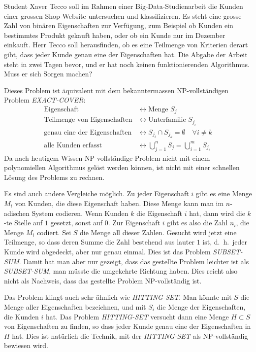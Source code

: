 Student Xaver Tecco soll im Rahmen einer Big-Data-Studienarbeit die 
Kunden einer grossen Shop-Website untersuchen und klassifizieren.
Es steht eine grosse Zahl von binären Eigenschaften zur Verfügung,
zum Beispiel ob Kunden ein bestimmtes Produkt gekauft haben, oder
ob ein Kunde nur im Dezember einkauft.
Herr Tecco soll herausfinden, ob es eine Teilmenge von Kriterien derart
gibt, dass jeder Kunde genau eine der Eigenschaften hat.
Die Abgabe der Arbeit steht in zwei Tagen bevor, und er hat noch keinen
funktionierenden Algorithmus.
Muss er sich Sorgen machen?

\begin{loesung}
Dieses Problem ist äquivalent mit dem bekanntermassen NP-vollständigen
Problem \textsl{EXACT-COVER}:
\begin{align*}
\text{Eigenschaft}&\leftrightarrow \text{Menge $S_j$}\\
\text{Teilmenge von Eigenschaften}&\leftrightarrow \text{Unterfamilie $S_{j_i}$}\\
\text{genau eine der Eigenschaften}&\leftrightarrow S_{j_i}\cap S_{j_k}=\emptyset\quad\forall i\ne k\\
\text{alle Kunden erfasst}&\leftrightarrow \bigcup_{j=1}^nS_j=\bigcup_{i=1}^m S_{j_i}
\end{align*}
Da nach heutigem Wissen NP-vollständige Problem nicht mit einem polynomiellen
Algorithmus gelöst werden können, ist nicht mit einer schnellen Lösung
des Problems zu rechnen.

Es sind auch andere Vergleiche möglich.
Zu jeder Eigenschaft $i$ gibt es eine Menge $M_i$ von Kunden, die diese
Eigenschaft haben.
Diese Menge kann man im $n$-adischen System codieren.
Wenn Kunden $k$ die Eigenschaft $i$ hat, dann wird die $k$-te Stelle
auf $1$ gesetzt, sonst auf $0$.
Zur Eigenschaft $i$ gibt es also die Zahl $n_i$, die Menge $M_i$
codiert.
Sei $S$ die Menge all dieser Zahlen.
Gesucht wird jetzt eine Teilmenge, so dass deren Summe die Zahl
bestehend aus lauter $1$ ist, d.~h.~jeder Kunde wird abgedeckt, aber
nur genau einmal.
Dies ist das Problem \textsl{SUBSET-SUM}.
Damit hat man aber nur gezeigt, dass das gestellte Problem leichter ist
als \textsl{SUBSET-SUM}, man müsste die umgekehrte Richtung haben.
Dies reicht also nicht als Nachweis, dass das gestellte Problem
NP-vollständig ist.

Das Problem klingt auch sehr ähnlich wie \textsl{HITTING-SET}.
Man könnte mit $S$ die Menge aller Eigenschaften bezeichnen,
und mit $S_i$ die Menge der Eigenschaften, die Kunden $i$ hat.
Das Problem \textsl{HITTING-SET} versucht dann eine Menge $H\subset S$
von Eigenschaften zu finden, so dass jeder Kunde genau eine der
Eigenschaften in $H$ hat.
Dies ist natürlich die Technik, mit der \textsl{HITTING-SET}
als NP-vollständig bewiesen wird.
\end{loesung}

